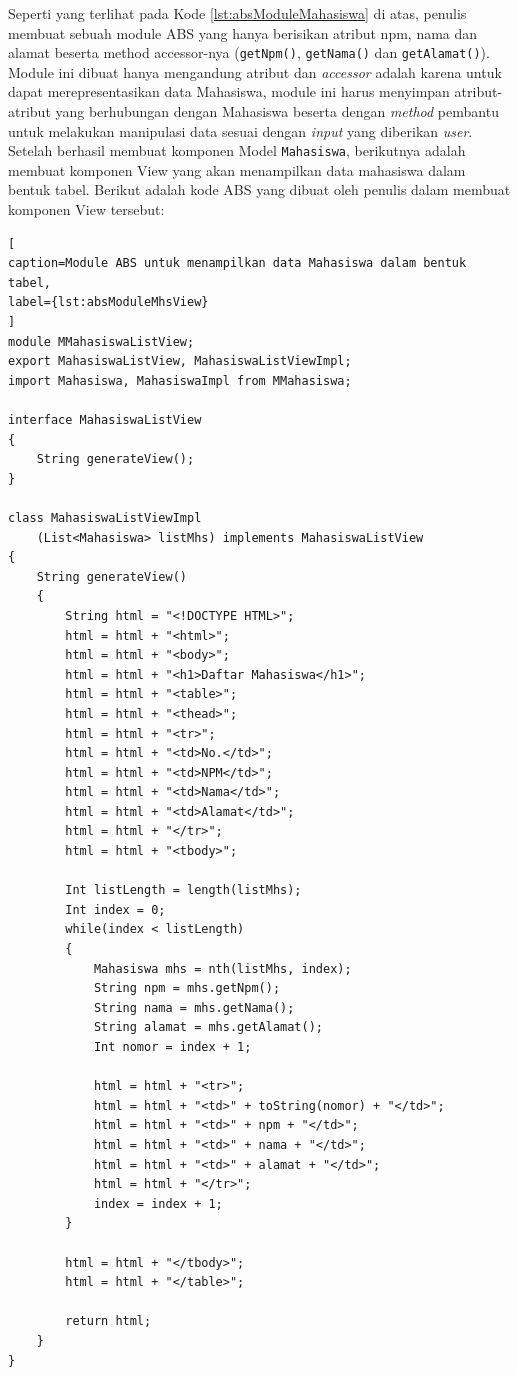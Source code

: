 Seperti yang terlihat pada Kode \ref{lst:absModuleMahasiswa} di atas, penulis membuat sebuah module ABS yang hanya berisikan atribut npm, nama dan alamat beserta method accessor-nya (\texttt{getNpm()}, \texttt{getNama()} dan \texttt{getAlamat()}). Module ini dibuat hanya mengandung atribut dan \textit{accessor} adalah karena untuk dapat merepresentasikan data Mahasiswa, module ini harus menyimpan atribut-atribut yang berhubungan dengan Mahasiswa beserta dengan \textit{method} pembantu untuk melakukan manipulasi data sesuai dengan \textit{input} yang diberikan \textit{user}.\\

Setelah berhasil membuat komponen Model \texttt{Mahasiswa}, berikutnya adalah membuat komponen View yang akan menampilkan data mahasiswa dalam bentuk tabel. Berikut adalah kode ABS yang dibuat oleh penulis dalam membuat komponen View tersebut:

\begin{lstlisting}[
caption=Module ABS untuk menampilkan data Mahasiswa dalam bentuk tabel,
label={lst:absModuleMhsView}
]
module MMahasiswaListView;
export MahasiswaListView, MahasiswaListViewImpl;
import Mahasiswa, MahasiswaImpl from MMahasiswa;

interface MahasiswaListView
{
	String generateView();
}

class MahasiswaListViewImpl
	(List<Mahasiswa> listMhs) implements MahasiswaListView
{
	String generateView()
	{
		String html = "<!DOCTYPE HTML>";
		html = html + "<html>";
		html = html + "<body>";
		html = html + "<h1>Daftar Mahasiswa</h1>";
		html = html + "<table>";
		html = html + "<thead>";
		html = html + "<tr>";
		html = html + "<td>No.</td>";
		html = html + "<td>NPM</td>";
		html = html + "<td>Nama</td>";
		html = html + "<td>Alamat</td>";
		html = html + "</tr>";
		html = html + "<tbody>";
		
		Int listLength = length(listMhs);
		Int index = 0;
		while(index < listLength)
		{
			Mahasiswa mhs = nth(listMhs, index);
			String npm = mhs.getNpm();
			String nama = mhs.getNama();
			String alamat = mhs.getAlamat();
			Int nomor = index + 1;
			
			html = html + "<tr>";
			html = html + "<td>" + toString(nomor) + "</td>";
			html = html + "<td>" + npm + "</td>";
			html = html + "<td>" + nama + "</td>";
			html = html + "<td>" + alamat + "</td>";
			html = html + "</tr>";
			index = index + 1;
		}
		
		html = html + "</tbody>";
		html = html + "</table>";
		
		return html;
	}
}
\end{lstlisting}

